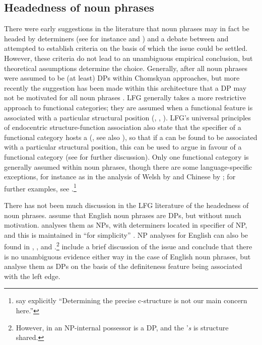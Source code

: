 \documentclass[output=paper,hidelinks]{langscibook}
\begin{document}
\subsection{Headedness of noun phrases}\label{NPDP}

There were early suggestions in the literature that noun phrases may in fact be headed by determiners (see for instance \citealt{Lyons77} and \citealt{Hudson84}) and a debate between \citet{Zwicky85} and \citet{Hudson87} attempted to establish criteria on the basis of which the issue could be settled. However, these criteria do not lead to an unambiguous empirical conclusion, but theoretical assumptions determine the choice. Generally, after \citet{Abney87} all noun phrases were assumed to be (at least) DPs within Chomskyan approaches, but more recently the suggestion has been made within this architecture that a DP may not be motivated for all noun phrases \citep{Boskovic08, Boskovic13}. LFG generally takes a more restrictive approach to functional categories; they are assumed when a functional feature is associated with a particular structural position (\citealt[6]{Kroeger93}, \citealt{BoPaChi99}, \citealt[92, 108]{Sadler00}). LFG's universal principles of endocentric structure-function association also state that the specifier of a functional category hosts a {\DF} (\citealt[105, 117]{BresnanEtAl2016}, see also ), so that if a {\DF} can be found to be associated with a particular structural position, this can be used to argue in favour of a functional category (see  for further discussion). Only one functional category is generally assumed within noun phrases, though there are some language-specific exceptions, for instance as in the analysis of Welsh by \citet{MittSadl05} and Chinese by \citet{Borjarsetal18}; for further examples, see \citet[102--103]{DLM:LFG}.\footnote{\citet{MittSadl05} say explicitly ``Determining the precise c-structure is not our main concern here.''}

There has not been much discussion in the LFG literature of the headedness of noun phrases. \citet{BresnanEtAl2016} assume that English noun phrases are DPs, but without much motivation. \citet{dalrymple01} analyses them as NPs, with determiners located in specifier of NP, and this is maintained in \citeauthor{DLM:LFG} ``for simplicity'' \citeyearpar[101]{DLM:LFG}.  NP analyses for English can also be found in \citet{ChisaPayn03}, \citet{ArnoSadl14}, and \citet{Lowe15}.\footnote{However, in \citet{Lowe15} an NP-internal possessor is a DP, and the '\emph{s} is structure shared.}  \citet{BoNoSa19} include a brief discussion of the issue and conclude that there is no unambiguous evidence either way in the case of English noun phrases, but analyse them as DPs on the basis of the definiteness feature being associated with the left edge.
\end{document}
